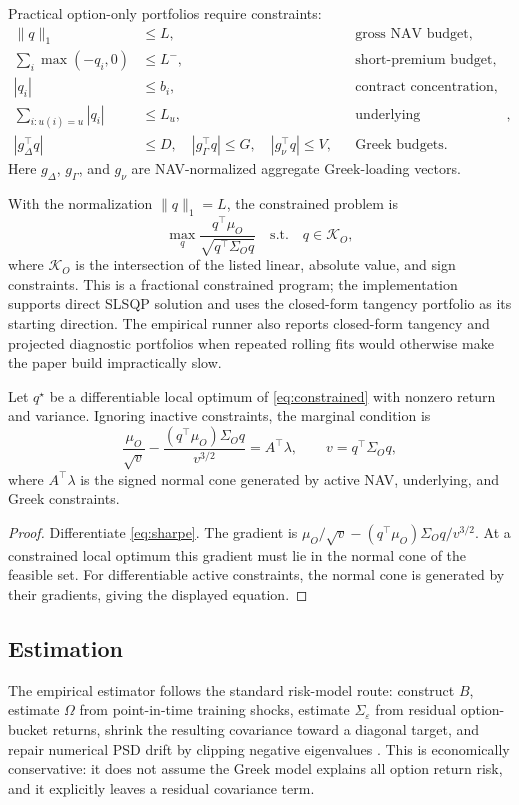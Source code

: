 Practical option-only portfolios require constraints:
\begin{align}
  \|q\|_1 &\le L, &&\text{gross NAV budget},\\
  \sum_i \max(-q_i,0) &\le L^-, &&\text{short-premium budget},\\
  |q_i| &\le b_i, &&\text{contract concentration},\\
  \sum_{i:u(i)=u}|q_i| &\le L_u, &&\text{underlying concentration},\\
  |g_\Delta^\top q| &\le D, \quad
  |g_\Gamma^\top q|\le G, \quad
  |g_\nu^\top q|\le V, &&\text{Greek budgets}.
\end{align}
Here $g_\Delta$, $g_\Gamma$, and $g_\nu$ are NAV-normalized aggregate
Greek-loading vectors.

With the normalization $\|q\|_1=L$, the constrained problem is
\begin{equation}
\max_q \frac{q^\top\mu_O}{\sqrt{q^\top\Sigma_Oq}}
\quad\text{s.t.}\quad q\in\mathcal{K}_O,
\label{eq:constrained}
\end{equation}
where $\mathcal{K}_O$ is the intersection of the listed linear, absolute
value, and sign constraints.  This is a fractional constrained program;
the implementation supports direct SLSQP solution and uses the closed-form
tangency portfolio as its starting direction.  The empirical runner also reports
closed-form tangency and projected diagnostic portfolios when repeated rolling fits
would otherwise make the paper build impractically slow.

\begin{proposition}
\label{prop:kkt}
Let $q^\star$ be a differentiable local optimum of
\eqref{eq:constrained} with nonzero return and variance.  Ignoring
inactive constraints, the marginal condition is
\[
 \frac{\mu_O}{\sqrt{v}}
 - \frac{(q^\top\mu_O)\Sigma_Oq}{v^{3/2}}
 =
 A^\top\lambda ,
 \qquad v=q^\top\Sigma_Oq,
\]
where $A^\top\lambda$ is the signed normal cone generated by active NAV,
underlying, and Greek constraints.
\end{proposition}

\begin{proof}
Differentiate \eqref{eq:sharpe}.  The gradient is
$\mu_O/\sqrt{v}-(q^\top\mu_O)\Sigma_Oq/v^{3/2}$.  At a constrained local
optimum this gradient must lie in the normal cone of the feasible set.
For differentiable active constraints, the normal cone is generated by
their gradients, giving the displayed equation.
\end{proof}

\subsection{Estimation}

The empirical estimator follows the standard risk-model route: construct
$B$, estimate $\Omega$ from point-in-time training shocks, estimate
$\Sigma_\varepsilon$ from residual option-bucket returns, shrink the
resulting covariance toward a diagonal target, and repair numerical PSD
drift by clipping negative eigenvalues \citep{ledoitwolf2004}. This is
economically conservative: it does not assume the Greek model explains
all option return risk, and it explicitly leaves a residual covariance
term.
